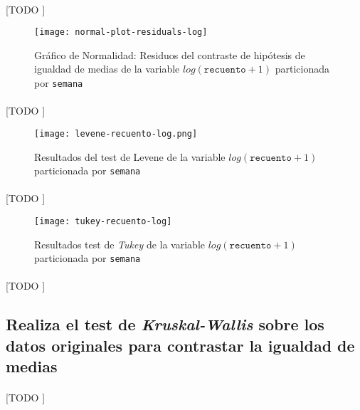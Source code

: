 \documentclass[11pt]{article}
\begin{document}
      \paragraph{}
      [TODO ]

      \begin{figure}[!h]
        \centering
        \texttt{[image: normal-plot-residuals-log]}
        \caption{Gráfico de Normalidad: Residuos del contraste de hipótesis de igualdad de medias de la variable $log(\texttt{recuento}+1)$ particionada por \texttt{semana}}
        \label{img:normal-plot-residuals-log}
      \end{figure}

      \paragraph{}
      [TODO ]

      \begin{figure}[!h]
        \centering
        \texttt{[image: levene-recuento-log.png]}
        \caption{Resultados del test de Levene de la variable $log(\texttt{recuento}+1)$ particionada por \texttt{semana}}
        \label{img:levene-test-log}
      \end{figure}

      \paragraph{}
      [TODO ]

      \begin{figure}[!h]
        \centering
        \texttt{[image: tukey-recuento-log]}
        \caption{Resultados test de \emph{Tukey} de la variable $log(\texttt{recuento}+1)$ particionada por \texttt{semana}}
        \label{img:tukey-recuento-log}
      \end{figure}

      \paragraph{}
      [TODO ]

    \subsection{Realiza el test de \emph{Kruskal-Wallis} sobre los datos originales para contrastar la igualdad de medias}
    \label{sec:e5}


      \paragraph{}
      [TODO ]
\end{document}
